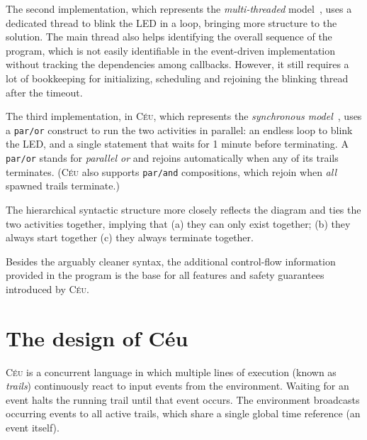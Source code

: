 \documentclass[10pt]{sensys-proc}
\newcommand{\CEU}{\textsc{C\'{e}u}\xspace}
\newcommand{\code}[1] {{\small{\texttt{#1}}}}
\begin{document}
The second implementation, which represents the \emph{multi-threaded} 
model~\cite{wsn.protothreads,wsn.mantisos}, uses a dedicated thread to blink 
the LED in a loop, bringing more structure to the solution.
The main thread also helps identifying the overall sequence of the program, 
which is not easily identifiable in the event-driven implementation without 
tracking the dependencies among callbacks.
However, it still requires a lot of bookkeeping for initializing, scheduling 
and rejoining the blinking thread after the timeout.


The third implementation, in \CEU, which represents the \emph{synchronous 
model}~\cite{wsn.osm,wsn.sol}, uses a \code{par/or} construct to run the two 
activities in parallel:
an endless loop to blink the LED, and a single statement that waits for 1 
minute before terminating.
A \code{par/or} stands for \emph{parallel or} and rejoins automatically when 
any of its trails terminates.
(\CEU also supports \code{par/and} compositions, which rejoin when \emph{all} 
spawned trails terminate.)

The hierarchical syntactic structure more closely reflects the diagram and ties 
the two activities together, implying that
(a) they can only exist together;
(b) they always start together
(c) they always terminate together.

Besides the arguably cleaner syntax, the additional control-flow information 
provided in the program is the base for all features and safety guarantees 
introduced by \CEU.


\section{The design of C\'eu}
\label{sec.ceu}

\CEU{} is a concurrent language in which multiple lines of execution (known as 
\emph{trails}) continuously react to input events from the environment.
Waiting for an event halts the running trail until that event occurs.
The environment broadcasts occurring events to all active trails, which share a 
single global time reference (an event itself).

\end{document}
